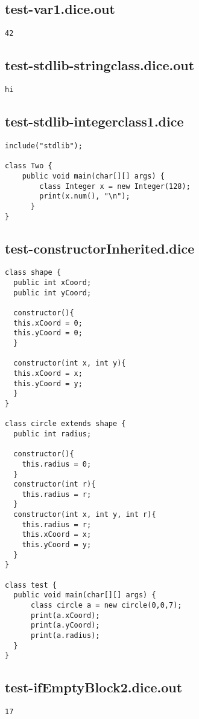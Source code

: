 \pagebreak
\subsection{test-var1.dice.out}
\begin{verbatim}
42
\end{verbatim}
\pagebreak
\subsection{test-stdlib-stringclass.dice.out}
\begin{verbatim}
hi
\end{verbatim}
\pagebreak
\subsection{test-stdlib-integerclass1.dice}
\begin{verbatim}
include("stdlib");

class Two {
	public void main(char[][] args) {
        class Integer x = new Integer(128);
        print(x.num(), "\n");
      }
}

\end{verbatim}
\pagebreak
\subsection{test-constructorInherited.dice}
\begin{verbatim}
class shape {
  public int xCoord;
  public int yCoord;

  constructor(){
  this.xCoord = 0;
  this.yCoord = 0;
  }

  constructor(int x, int y){
  this.xCoord = x;
  this.yCoord = y;
  }
}

class circle extends shape {
  public int radius;

  constructor(){
  	this.radius = 0;
  }
  constructor(int r){
  	this.radius = r;
  }
  constructor(int x, int y, int r){
  	this.radius = r;
  	this.xCoord = x;
  	this.yCoord = y;
  }
}

class test {
  public void main(char[][] args) {
      class circle a = new circle(0,0,7); 
      print(a.xCoord);
      print(a.yCoord);
      print(a.radius);
  }
}
\end{verbatim}
\pagebreak
\subsection{test-ifEmptyBlock2.dice.out}
\begin{verbatim}
17
\end{verbatim}
\pagebreak
